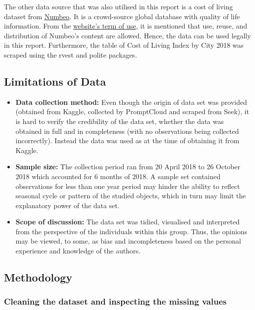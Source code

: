 \documentclass[11pt,a4paper,]{article}
\providecommand{\tightlist}{%
  \setlength{\itemsep}{0pt}\setlength{\parskip}{0pt}}
\begin{document}
The other data source that was also utilised in this report is a cost of living dataset from \href{https://www.numbeo.com/cost-of-living/rankings.jsp?title=2018}{Numbeo}. It is a crowd-source global database with quality of life information. From the \href{https://www.numbeo.com/common/terms_of_use.jsp}{website's term of use}, it is mentioned that use, reuse, and distribution of Numbeo's content are allowed. Hence, the data can be used legally in this report. Furthermore, the table of Cost of Living Index by City 2018 was scraped using the rvest and polite packages.

\hypertarget{limitations-of-data}{%
\subsection{Limitations of Data}\label{limitations-of-data}}

\begin{itemize}
\tightlist
\item
  \textbf{Data collection method:} Even though the origin of data set was provided (obtained from Kaggle, collected by PromptCloud and scraped from Seek), it is hard to verify the credibility of the data set, whether the data was obtained in full and in completeness (with no observations being collected incorrectly). Instead the data was used as at the time of obtaining it from Kaggle.
\item
  \textbf{Sample size:} The collection period ran from 20 April 2018 to 26 October 2018 which accounted for 6 months of 2018. A sample set contained observations for less than one year period may hinder the ability to reflect seasonal cycle or pattern of the studied objects, which in turn may limit the explanatory power of the data set.\\
\item
  \textbf{Scope of discussion:} The data set was tidied, visualised and interpreted from the perspective of the individuals within this group. Thus, the opinions may be viewed, to some, as bias and incompleteness based on the personal experience and knowledge of the authors.
\end{itemize}

\hypertarget{methodology}{%
\subsection{Methodology}\label{methodology}}

\hypertarget{cleaning-the-dataset-and-inspecting-the-missing-values}{%
\subsubsection{Cleaning the dataset and inspecting the missing values}\label{cleaning-the-dataset-and-inspecting-the-missing-values}}
\end{document}
